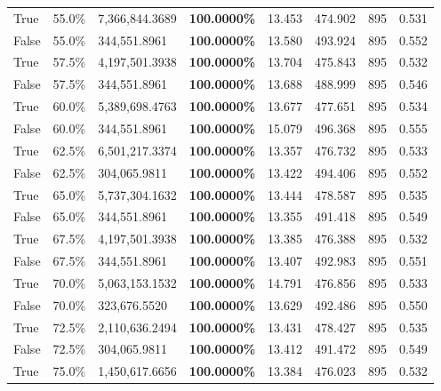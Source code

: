 \begin{table}[H]
\begin{tabular}{lllrllll}
\cline{1-8}
True & 55.0\% & 7,366,844.3689 & \bfseries \color{red} 100.0000\% & 13.453 & 474.902 & 895 & 0.531 \\
\cline{1-8}
False & 55.0\% & 344,551.8961 & \bfseries \color{red} 100.0000\% & 13.580 & 493.924 & 895 & 0.552 \\
\cline{1-8}
True & 57.5\% & 4,197,501.3938 & \bfseries \color{red} 100.0000\% & 13.704 & 475.843 & 895 & 0.532 \\
\cline{1-8}
False & 57.5\% & 344,551.8961 & \bfseries \color{red} 100.0000\% & 13.688 & 488.999 & 895 & 0.546 \\
\cline{1-8}
True & 60.0\% & 5,389,698.4763 & \bfseries \color{red} 100.0000\% & 13.677 & 477.651 & 895 & 0.534 \\
\cline{1-8}
False & 60.0\% & 344,551.8961 & \bfseries \color{red} 100.0000\% & 15.079 & 496.368 & 895 & 0.555 \\
\cline{1-8}
True & 62.5\% & 6,501,217.3374 & \bfseries \color{red} 100.0000\% & 13.357 & 476.732 & 895 & 0.533 \\
\cline{1-8}
False & 62.5\% & 304,065.9811 & \bfseries \color{red} 100.0000\% & 13.422 & 494.406 & 895 & 0.552 \\
\cline{1-8}
True & 65.0\% & 5,737,304.1632 & \bfseries \color{red} 100.0000\% & 13.444 & 478.587 & 895 & 0.535 \\
\cline{1-8}
False & 65.0\% & 344,551.8961 & \bfseries \color{red} 100.0000\% & 13.355 & 491.418 & 895 & 0.549 \\
\cline{1-8}
True & 67.5\% & 4,197,501.3938 & \bfseries \color{red} 100.0000\% & 13.385 & 476.388 & 895 & 0.532 \\
\cline{1-8}
False & 67.5\% & 344,551.8961 & \bfseries \color{red} 100.0000\% & 13.407 & 492.983 & 895 & 0.551 \\
\cline{1-8}
True & 70.0\% & 5,063,153.1532 & \bfseries \color{red} 100.0000\% & 14.791 & 476.856 & 895 & 0.533 \\
\cline{1-8}
False & 70.0\% & 323,676.5520 & \bfseries \color{red} 100.0000\% & 13.629 & 492.486 & 895 & 0.550 \\
\cline{1-8}
True & 72.5\% & 2,110,636.2494 & \bfseries \color{red} 100.0000\% & 13.431 & 478.427 & 895 & 0.535 \\
\cline{1-8}
False & 72.5\% & 304,065.9811 & \bfseries \color{red} 100.0000\% & 13.412 & 491.472 & 895 & 0.549 \\
\cline{1-8}
True & 75.0\% & 1,450,617.6656 & \bfseries \color{red} 100.0000\% & 13.384 & 476.023 & 895 & 0.532 \\

\end{tabular}
\end{table}
